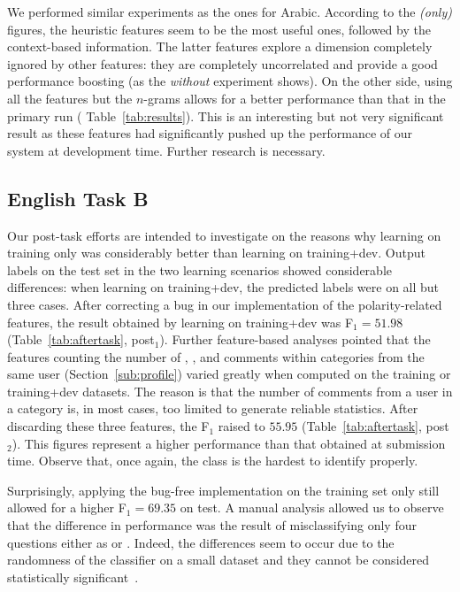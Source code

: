 We performed similar experiments as the ones for Arabic. According to the 
\textit{(only)} figures, the heuristic features seem to be the most useful ones, 
followed by the context-based information. The latter features explore a 
dimension completely ignored by other features:  they are completely 
uncorrelated and provide a good performance boosting (as the \textit{without} 
experiment shows). On the other side, using all the features but the $n$-grams 
allows for a better performance than that in the primary run (\cf 
Table~\ref{tab:results}). This is an interesting but not very significant result 
as these features had significantly pushed up the performance of our system at 
development time. Further research is necessary.
  
\subsection{English Task B} \label{sec:discussionb}

Our post-task efforts are intended to investigate on the reasons why learning on 
training only was considerably better than learning on training+dev. Output 
labels on the test set in the two learning scenarios showed considerable 
differences: when learning on training+dev, the predicted labels were \yes on 
all but three cases. After correcting a bug in our implementation of the 
polarity-related features, the result obtained by learning on training+dev was 
F$_1=51.98$ (Table~\ref{tab:aftertask}, post$_1$). Further feature-based 
analyses pointed that the features counting the number of \good, \bad, and \pot 
comments within categories from the same user (\cf Section~\ref{sub:profile}) 
varied greatly when computed on the training or training+dev datasets. The 
reason is that the number of comments from a user in a category is, in most 
cases, too limited to generate reliable statistics. After discarding these three 
features, the F$_1$ raised to $55.95$ (Table~\ref{tab:aftertask}, post$_2$). 
This figures represent a higher performance than that obtained at submission 
time. Observe that, once again, the \unsure class is the hardest to identify 
properly.

Surprisingly, applying the bug-free implementation on the training set only 
still allowed for a higher F$_1 =69.35$ on test. A manual analysis allowed us 
to observe that the difference in performance was the result of misclassifying 
only four questions either as \yes or \unsure. Indeed, the differences seem to 
occur due to the randomness of the classifier on a small dataset and they 
cannot be considered statistically 
significant~\cite{Marquez-EtAl:2015:SemEval}. 

